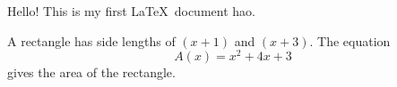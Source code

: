 \documentclass[11pt]{article}
\begin{document}
Hello! This is my first \LaTeX\ document hao.

A rectangle has side lengths of $(x+1)$ and $(x+3)$.
The equation $${A(x)=x^2+4x+3}$$ gives the area of the rectangle.
\end{document}
